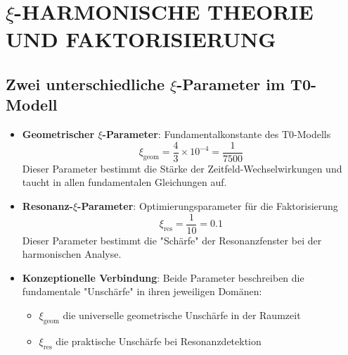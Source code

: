 \documentclass[12pt,a4paper]{article}
\begin{document}
	\section{$\xi$-HARMONISCHE THEORIE UND FAKTORISIERUNG}
	
	\subsection{Zwei unterschiedliche $\xi$-Parameter im T0-Modell}
	\begin{itemize}
		\item \textbf{Geometrischer $\xi$-Parameter}: Fundamentalkonstante des T0-Modells
		\begin{equation}
			\xi_{\text{geom}} = \frac{4}{3} \times 10^{-4} = \frac{1}{7500}
		\end{equation}
		Dieser Parameter bestimmt die Stärke der Zeitfeld-Wechselwirkungen und taucht in allen fundamentalen Gleichungen auf.
		
		\item \textbf{Resonanz-$\xi$-Parameter}: Optimierungsparameter für die Faktorisierung
		\begin{equation}
			\xi_{\text{res}} = \frac{1}{10} = 0.1
		\end{equation}
		Dieser Parameter bestimmt die "Schärfe" der Resonanzfenster bei der harmonischen Analyse.
		
		\item \textbf{Konzeptionelle Verbindung}: Beide Parameter beschreiben die fundamentale "Unschärfe" in ihren jeweiligen Domänen:
		\begin{itemize}
			\item $\xi_{\text{geom}}$ die universelle geometrische Unschärfe in der Raumzeit
			\item $\xi_{\text{res}}$ die praktische Unschärfe bei Resonanzdetektion
		\end{itemize}
	\end{itemize}
	
\end{document}
